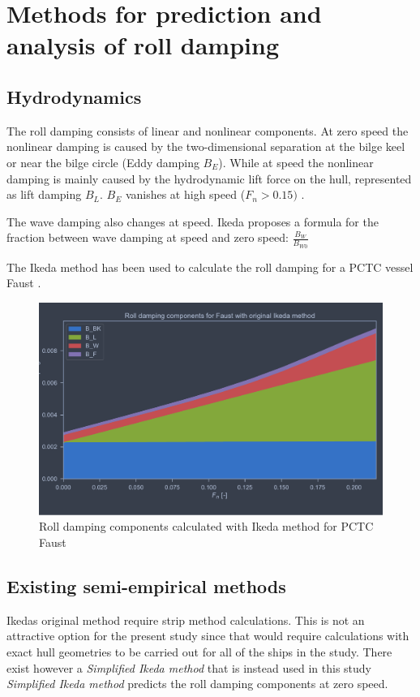\section{Methods for prediction and analysis of roll damping}
\label{se:methods_for_prediction_and_analysis}

\subsection{Hydrodynamics}
\label{se:hydrodynamics}
The roll damping consists of linear and nonlinear components. At zero speed the nonlinear damping is caused by the two-dimensional separation at the bilge keel or near the bilge circle (Eddy damping $B_E$). While at speed the nonlinear damping is mainly caused by the hydrodynamic lift force on the hull, represented as lift damping $B_L$. $B_E$ vanishes at high speed ($F_n>0.15)$ \cite{ikeda_components_1978}.

The wave damping also changes at speed. Ikeda \cite{ikeda_components_1978} proposes a formula for the fraction between wave damping at speed and zero speed: $\frac{B_W}{B_{W0}}$

The Ikeda method has been used to calculate the roll damping for a PCTC vessel Faust \cite{soder_assessment_2019}.
\begin{figure}[h]
    \centering
    \includegraphics[width=\columnwidth]{figures/ikeda_faust.pdf}
    \caption{Roll damping components calculated with Ikeda method for PCTC Faust}
    \label{fig:ikeda_faust}
\end{figure}

\subsection{Existing semi-empirical methods}
Ikedas original method require strip method calculations. This is not an attractive option for the present study since that would require calculations with exact hull geometries to be carried out for all of the ships in the study. There exist however a \emph{Simplified Ikeda method} \cite{kawahara_simple_2011} that is instead used in this study \emph{Simplified Ikeda method} predicts the roll damping components at zero speed.

